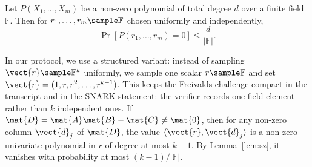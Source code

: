 \begin{lemma}\label{lem:sz}
Let $P(X_1, \ldots, X_m)$ be a non-zero polynomial of total degree $d$ over a finite field $\mathbb{F}$.
Then for $r_1, \ldots, r_m \sample \mathbb{F}$ chosen uniformly and independently,
\[
\Pr[P(r_1, \ldots, r_m) = 0] \le \frac{d}{|\mathbb{F}|}.
\]
\end{lemma}

In our protocol, we use a structured variant: instead of sampling $\vect{r} \sample \mathbb{F}^k$ uniformly, we sample one scalar $r \sample \mathbb{F}$ and set $\vect{r} = (1, r, r^2, \ldots, r^{k-1})$.
This keeps the Freivalds challenge compact in the transcript and in the SNARK
statement: the verifier records one field element rather than $k$ independent
ones. If $\mat{D} = \mat{A}\mat{B} - \mat{C} \neq \mat{0}$, then for any non-zero
column $\vect{d}_j$ of $\mat{D}$, the value $\langle \vect{r}, \vect{d}_j \rangle$ is a non-zero univariate polynomial in
$r$ of degree at most $k-1$.
By Lemma~\ref{lem:sz}, it vanishes with probability at most $(k-1)/|\mathbb{F}|$.
